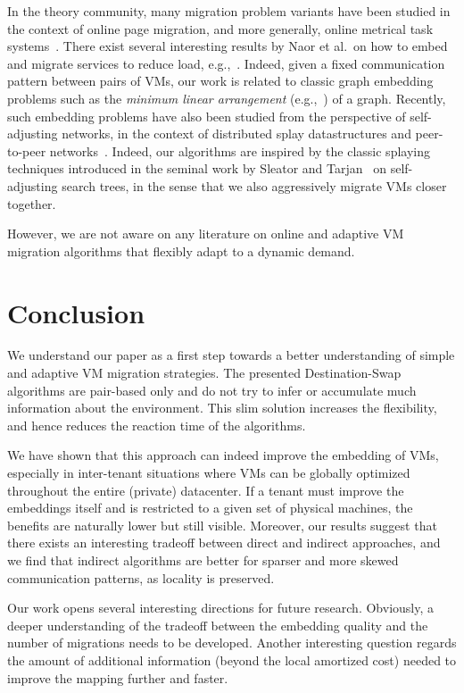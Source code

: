 \documentclass[conference]{IEEEtran}
\begin{document}
In the theory community, many migration
problem variants have been studied in the context of
online page migration, and more generally, online metrical task systems~\cite{borodin}.
There exist several interesting results by Naor et al.~on how to embed
and migrate services to reduce load, e.g.,~\cite{podc11,seffi-mini}.
Indeed, given a fixed communication pattern between pairs of VMs, our work is related to classic
graph embedding problems such as the \emph{minimum linear arrangement} (e.g.,~\cite{mla}) of a graph.
Recently, such embedding problems have also been studied from the perspective of self-adjusting
networks, in the context of distributed splay datastructures and peer-to-peer networks~\cite{ipdps13}.
Indeed, our algorithms are inspired by the classic splaying techniques introduced
in the seminal work by Sleator and Tarjan~\cite{Sleator:1985:SBS:3828.3835} on self-adjusting search trees,
in the sense that we also aggressively migrate VMs closer together.


However, we are not aware on any literature on online and adaptive VM migration algorithms that flexibly
adapt to a dynamic demand.



\section{Conclusion}\label{sec:conclusion}

We understand our paper as a first step towards a better understanding of simple and adaptive VM
migration strategies. The presented Destination-Swap algorithms are pair-based only and do not try to infer or accumulate
much information about the environment. This slim solution increases the flexibility, and hence reduces the reaction time of the
algorithms.

We have shown that this approach can indeed improve the embedding of VMs, especially in inter-tenant situations where VMs can be globally
optimized throughout the entire (private) datacenter. If a tenant must improve the embeddings itself and is restricted to a given set
of physical machines, the benefits are naturally lower but still visible. Moreover, our results suggest that there exists an interesting
tradeoff between direct and indirect approaches, and we find that indirect algorithms are better for sparser and more skewed
communication patterns, as locality is preserved.

Our work opens several interesting directions for future research. Obviously, a deeper understanding of the tradeoff between
the embedding quality and the number of migrations needs to be developed. Another interesting question regards the amount of
additional information (beyond the local amortized cost) needed to improve the mapping further and faster.


{\footnotesize
\renewcommand{\baselinestretch}{.83}


}
\end{document}
